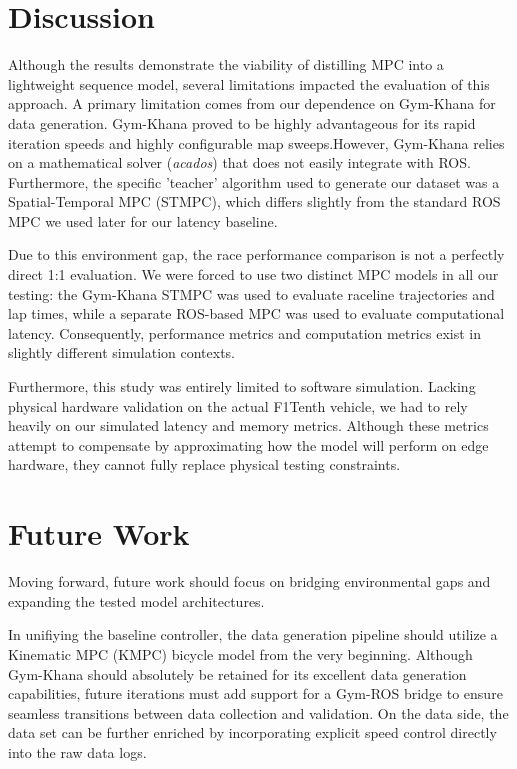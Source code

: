 \documentclass[conference]{IEEEtran}
\begin{document}
\section{Discussion}

Although the results demonstrate the viability of distilling MPC into a lightweight sequence model, several limitations impacted the evaluation of this approach. A primary limitation comes from our dependence on Gym-Khana for data generation. Gym-Khana proved to be highly advantageous for its rapid iteration speeds and highly configurable map sweeps.However, Gym-Khana relies on a mathematical solver (\textit{acados}) that does not easily integrate with ROS. Furthermore, the specific 'teacher' algorithm used to generate our dataset was a Spatial-Temporal MPC (STMPC), which differs slightly from the standard ROS MPC we used later for our latency baseline.

Due to this environment gap, the race performance comparison is not a perfectly direct 1:1 evaluation. We were forced to use two distinct MPC models in all our testing: the Gym-Khana STMPC was used to evaluate raceline trajectories and lap times, while a separate ROS-based MPC was used to evaluate computational latency. Consequently, performance metrics and computation metrics exist in slightly different simulation contexts.

Furthermore, this study was entirely limited to software simulation. Lacking physical hardware validation on the actual F1Tenth vehicle, we had to rely heavily on our simulated latency and memory metrics. Although these metrics attempt to compensate by approximating how the model will perform on edge hardware, they cannot fully replace physical testing constraints.

\section{Future Work}

Moving forward, future work should focus on bridging environmental gaps and expanding the tested model architectures. 

In unifiying the baseline controller, the data generation pipeline should utilize a Kinematic MPC (KMPC) bicycle model from the very beginning. Although Gym-Khana should absolutely be retained for its excellent data generation capabilities, future iterations must add support for a Gym-ROS bridge to ensure seamless transitions between data collection and validation. On the data side, the data set can be further enriched by incorporating explicit speed control directly into the raw data logs.
\end{document}

